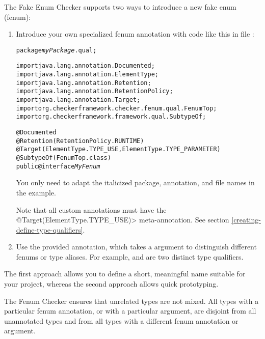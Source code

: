 
The Fake Enum Checker supports two ways to introduce a new fake enum (fenum):

\begin{enumerate}
\item Introduce your own specialized fenum annotation with code like this in
file :

\begin{alltt}
package \textit{myPackage}.qual;

import java.lang.annotation.Documented;
import java.lang.annotation.ElementType;
import java.lang.annotation.Retention;
import java.lang.annotation.RetentionPolicy;
import java.lang.annotation.Target;
import org.checkerframework.checker.fenum.qual.FenumTop;
import org.checkerframework.framework.qual.SubtypeOf;

@Documented
@Retention(RetentionPolicy.RUNTIME)
@Target(\ttlcb{}ElementType.TYPE_USE, ElementType.TYPE_PARAMETER\ttrcb)
@SubtypeOf(FenumTop.class)
public @interface \textit{MyFenum} \ttlcb\ttrcb
\end{alltt}

You only need to adapt the italicized package, annotation, and file names in the example.

Note that all custom annotations must have the
\<@Target(\ttlcb ElementType.TYPE\_USE\ttrcb)> meta-annotation. See section
\ref{creating-define-type-qualifiers}.

\item Use the provided  annotation, which takes a
 argument to distinguish different fenums or type aliases.
For example,  and  are two distinct
type qualifiers.
\end{enumerate}


The first approach allows you to define a short, meaningful name suitable for
your project, whereas the second approach allows quick prototyping.




The Fenum Checker ensures that unrelated types are not mixed.
All types with a particular fenum annotation, or  with a
particular  argument, are
disjoint from all unannotated types and from all types with a different fenum
annotation or  argument.

